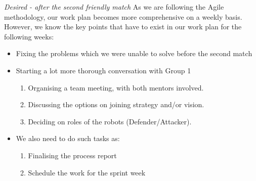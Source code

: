 \documentclass[12pt,oneside]{article}
\begin{document}
			\emph{Desired - after the second friendly match}
			As we are following the Agile methodology, our work plan becomes more comprehensive on a weekly basis. However, we know the key points that have to exist in our work plan for the following weeks:
			\begin{itemize}
				\item Fixing the problems which we were unable to solve before the second match
				\item Starting a lot more thorough conversation with Group 1
				\begin{enumerate}
					\item Organising a team meeting, with both mentors involved.
					\item Discussing the options on joining strategy and/or vision.
					\item Deciding on roles of the robots (Defender/Attacker).
				\end{enumerate}
				\item We also need to do such tasks as:
				\begin{enumerate}
					\item Finalising the process report
					\item Schedule the work for the sprint week
				\end{enumerate}
			\end{itemize}
\end{document}
